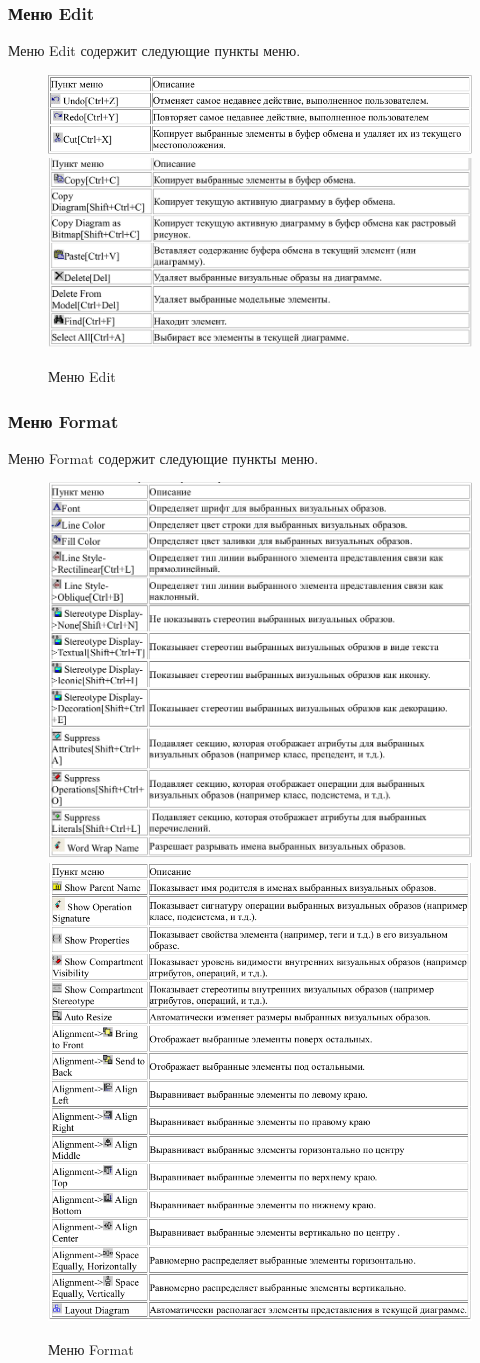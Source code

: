 \documentclass[a4paper,12pt]{extreport}
\begin{document}
\subsubsection*{Меню Edit}
Меню Edit содержит следующие пункты меню.
\begin{figure}[h!]
	\centering
	\includegraphics[width=0.796\linewidth]{images/editmenu1}
	\includegraphics[width=0.8\linewidth]{images/editmenu2}
	\caption{Меню Edit}
	\label{fig:editmenu}
\end{figure}
\newpage
\subsubsection*{Меню Format}
Меню Format содержит следующие пункты меню.
\begin{figure}[h!]
	\centering
	\includegraphics[width=0.6\linewidth]{images/formatmenu1}
	\includegraphics[width=0.6005\linewidth]{images/formatmenu2}
	\caption{Меню Format}
	\label{fig:formatmenu}
\end{figure}
\newpage
\end{document}
